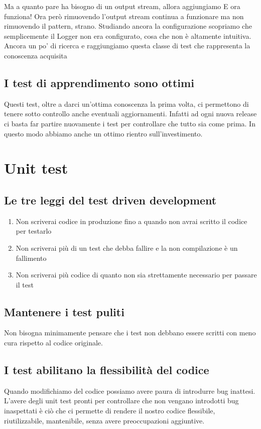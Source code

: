 \documentclass[11pt,a4paper]{book}
\begin{document}
Ma a quanto pare ha bisogno di un output stream, allora aggiungiamo
\label{code: 051}
E ora funziona! Ora però rimuovendo l'output stream continua a funzionare ma non rimuovendo il pattern, strano. Studiando ancora la configurazione scopriamo che semplicemente il Logger non era configurato, cosa che non è altamente intuitiva. Ancora un po' di ricerca e raggiungiamo questa classe di test che rappresenta la conoscenza acquisita
\label{code: 052}

\section{I test di apprendimento sono ottimi}
Questi test, oltre a darci un'ottima conoscenza la prima volta, ci permettono di tenere sotto controllo anche eventuali aggiornamenti. Infatti ad ogni nuova release ci basta far partire nuovamente i test per controllare che tutto sia come prima. In questo modo abbiamo anche un ottimo rientro sull'investimento.

\chapter{Unit test}
\section{Le tre leggi del test driven development}
\begin{enumerate}
	\item Non scriverai codice in produzione fino a quando non avrai scritto il codice per testarlo
	\item Non scriverai più di un test che debba fallire e la non compilazione è un fallimento
	\item Non scriverai più codice di quanto non sia strettamente necessario per passare il test
\end{enumerate}

\section{Mantenere i test puliti}
Non bisogna minimamente pensare che i test non debbano essere scritti con meno cura rispetto al codice originale.

\section{I test abilitano la flessibilità del codice}
Quando modifichiamo del codice possiamo avere paura di introdurre bug inattesi. L'avere degli unit test pronti per controllare che non vengano introdotti bug inaspettati è ciò che ci permette di rendere il nostro codice flessibile, riutilizzabile, mantenibile, senza avere preoccupazioni aggiuntive.
\end{document}
